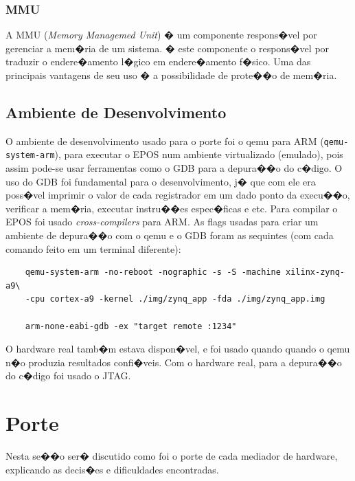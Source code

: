 \documentclass{ufscThesis/ufscThesis} %
\begin{document}
\subsection{MMU} %

A MMU (\emph{Memory Managemed Unit}) � um componente respons�vel por gerenciar a mem�ria de um sistema. � este componente o respons�vel por traduzir o endere�amento l�gico em endere�amento f�sico. Uma das principais vantagens de seu uso � a possibilidade de prote��o de mem�ria.

\section{Ambiente de Desenvolvimento}

O ambiente de desenvolvimento usado para o porte foi o qemu para ARM (\verb+qemu-system-arm+), para executar o EPOS num ambiente virtualizado (emulado), pois assim pode-se usar ferramentas como o GDB para a depura��o do c�digo. O uso do GDB foi fundamental para o desenvolvimento, j� que com ele era poss�vel imprimir o valor de cada registrador em um dado ponto da execu��o, verificar a mem�ria, executar instru��es espec�ficas e etc. Para compilar o EPOS foi usado \emph{cross-compilers} para ARM. As flags usadas para criar um ambiente de depura��o com o qemu e o GDB foram as sequintes (com cada comando feito em um terminal diferente):
\begin{verbatim}
	qemu-system-arm -no-reboot -nographic -s -S -machine xilinx-zynq-a9\
	-cpu cortex-a9 -kernel ./img/zynq_app -fda ./img/zynq_app.img

	arm-none-eabi-gdb -ex "target remote :1234"
\end{verbatim}

O hardware real tamb�m estava dispon�vel, e foi usado quando quando o qemu n�o produzia resultados confi�veis. Com o hardware real, para a depura��o do c�digo foi usado o JTAG.

\chapter{Porte}



Nesta se��o ser� discutido como foi o porte de cada mediador de hardware, explicando as decis�es e dificuldades encontradas.
\end{document}
